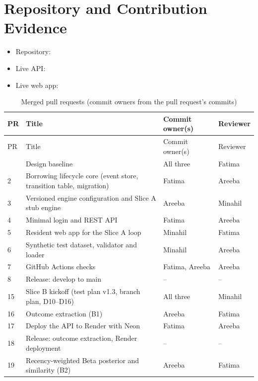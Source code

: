 \chapter{Repository and Contribution Evidence}\label{app:repository-contribution-evidence}
\begin{itemize}
\item Repository: 
\item Live API: 
\item Live web app: 
\end{itemize}

\begingroup
\begin{longtable}{@{}L{20pt}L{195pt}L{81pt}L{69pt}@{}}
\caption{Merged pull requests (commit owners from the pull request's commits)}\label{tab:merged-pull-requests-commit}\\
\toprule
PR & Title & Commit owner(s) & Reviewer \\
\midrule
\endfirsthead
\toprule
PR & Title & Commit owner(s) & Reviewer \\
\midrule
\endhead
\bottomrule
{} & Design baseline & All three & Fatima \\
2 & Borrowing lifecycle core (event store, transition table, migration) & Fatima & Areeba \\
3 & Versioned engine configuration and Slice A stub engine & Areeba & Minahil \\
4 & Minimal login and REST API & Fatima & Areeba \\
5 & Resident web app for the Slice A loop & Minahil & Fatima \\
6 & Synthetic test dataset, validator and loader & Minahil & Areeba \\
7 & GitHub Actions checks & Fatima, Areeba & Areeba \\
8 & Release: develop to main & -- & -- \\
15 & Slice B kickoff (test plan v1.3, branch plan, D10--D16) & All three & Minahil \\
16 & Outcome extraction (B1) & Areeba & Fatima \\
17 & Deploy the API to Render with Neon & Fatima & Areeba \\
18 & Release: outcome extraction, Render deployment & -- & -- \\
19 & Recency-weighted Beta posterior and similarity (B2) & Areeba & Fatima \\

\end{longtable}
